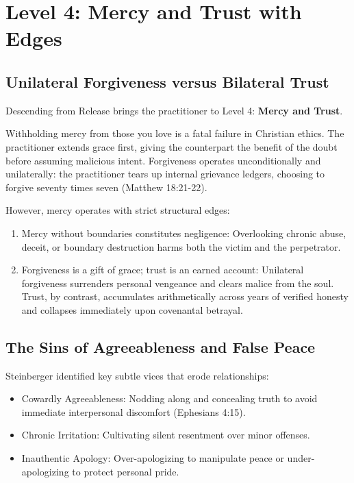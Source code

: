 \documentclass[11pt,twocolumn]{article}
\begin{document}
\section{Level 4: Mercy and Trust with Edges}

\subsection{Unilateral Forgiveness versus Bilateral Trust}
Descending from Release brings the practitioner to Level 4: \textbf{Mercy and Trust}. 

Withholding mercy from those you love is a fatal failure in Christian ethics. The practitioner extends grace first, giving the counterpart the benefit of the doubt before assuming malicious intent. Forgiveness operates unconditionally and unilaterally: the practitioner tears up internal grievance ledgers, choosing to forgive seventy times seven (Matthew 18:21-22).

However, mercy operates with strict structural edges:
\begin{enumerate}
    \item Mercy without boundaries constitutes negligence: Overlooking chronic abuse, deceit, or boundary destruction harms both the victim and the perpetrator.
    \item Forgiveness is a gift of grace; trust is an earned account: Unilateral forgiveness surrenders personal vengeance and clears malice from the soul. Trust, by contrast, accumulates arithmetically across years of verified honesty and collapses immediately upon covenantal betrayal.
\end{enumerate}

\subsection{The Sins of Agreeableness and False Peace}
Steinberger identified key subtle vices that erode relationships:
\begin{itemize}
    \item Cowardly Agreeableness: Nodding along and concealing truth to avoid immediate interpersonal discomfort (Ephesians 4:15).
    \item Chronic Irritation: Cultivating silent resentment over minor offenses.
    \item Inauthentic Apology: Over-apologizing to manipulate peace or under-apologizing to protect personal pride.
\end{itemize}
\end{document}
